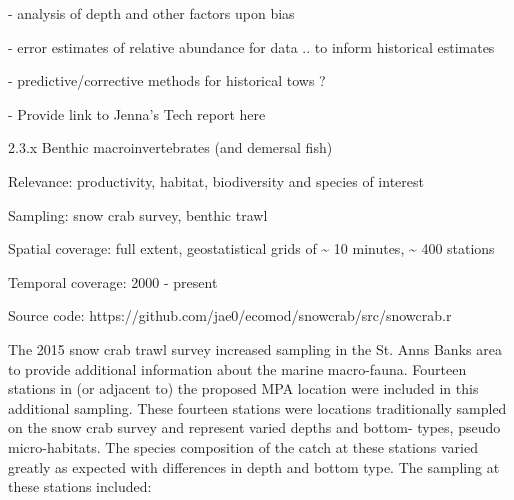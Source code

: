 \documentclass[letterpaper,portrait,12pt]{scrartcl}
\numberwithin{equation}{section}		%
\numberwithin{figure}{section}			%
\numberwithin{table}{section}				%
\begin{document}
 




- analysis of depth and other factors upon bias




- error estimates of relative abundance for data .. to inform historical estimates




- predictive/corrective methods for historical tows ?









- Provide link to Jenna's Tech report here














2.3.x Benthic macroinvertebrates (and demersal fish)









Relevance:  productivity, habitat, biodiversity and species of interest




Sampling:  snow crab survey, benthic trawl 




Spatial coverage: full extent, geostatistical grids of \~{} 10 minutes, \~{} 400 stations




Temporal coverage: 2000 - present




Source code: https://github.com/jae0/ecomod/snowcrab/src/snowcrab.r














The 2015 snow crab trawl survey increased sampling in the St. Anns Banks area to provide additional information about the marine macro-fauna. Fourteen stations in (or adjacent to) the proposed MPA location were included in this additional sampling. These fourteen stations were locations traditionally sampled on the snow crab survey and represent varied depths and bottom- types, pseudo micro-habitats. The species composition of the catch at these stations varied greatly as expected with differences in depth and bottom type. The sampling at these stations included:
\end{document}
